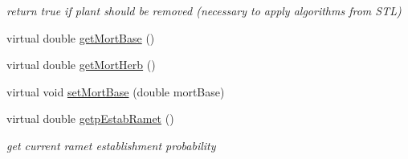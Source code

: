 \begin{DoxyCompactItemize}
\begin{DoxyCompactList}\small\item\em return true if plant should be removed (necessary to apply algorithms from S\+TL) \end{DoxyCompactList}\item 
virtual double \mbox{\hyperlink{class_c_plant_a045f39f51bcafabb15d0e16bdd58b017}{get\+Mort\+Base}} ()
\item 
virtual double \mbox{\hyperlink{class_c_plant_a7f215cff30196620f8a22e494f5f61ca}{get\+Mort\+Herb}} ()
\item 
virtual void \mbox{\hyperlink{class_c_plant_a6e71f471594572aee0216d0958b893e8}{set\+Mort\+Base}} (double mort\+Base)
\item 
virtual double \mbox{\hyperlink{class_c_plant_a5ab0a36c3e58898c7c750db485eca653}{getp\+Estab\+Ramet}} ()
\begin{DoxyCompactList}\small\item\em get current ramet establishment probability \end{DoxyCompactList}\end{DoxyCompactItemize}
